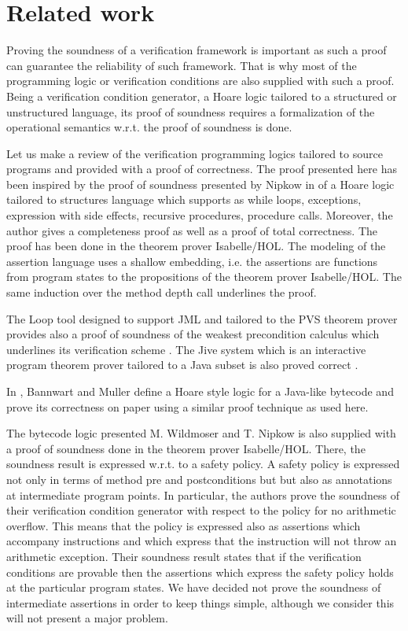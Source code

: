 \section{Related work}\label{proof:relWork}

Proving the soundness of a verification framework is important as such a proof 
can guarantee the reliability of such framework. That is why most of the programming logic
or verification conditions are also supplied with such a proof. 
Being  a verification condition generator, a Hoare logic tailored to a structured or unstructured language, 
 its proof of soundness requires a formalization of the operational semantics  w.r.t. the proof of soundness is done.  

 Let us make a review of the verification programming logics tailored to source programs and provided with a proof
 of correctness. The proof presented here has been inspired by the proof of soundness presented by Nipkow in \cite{Nipkow-MOD2001}
 of a Hoare logic tailored to structures language which supports as while loops, exceptions, expression with side effects,
 recursive procedures, procedure calls. Moreover, the author gives a completeness proof  as well as a proof of  total correctness.
  The proof has been done in the theorem prover Isabelle/HOL. The modeling of the 
 assertion language uses a  shallow embedding, i.e. the assertions are functions from program states to 
  the propositions of the theorem prover Isabelle/HOL. The same induction over the method depth call underlines the proof. 

 The Loop tool designed to support JML and tailored to the PVS theorem prover
  provides also a proof of soundness of the weakest precondition calculus which underlines
 its verification scheme \cite{Jacobs04WPJ}. The Jive system which is an interactive program theorem prover tailored to a Java subset is
 also  proved correct \cite{MH00Arc}.
   
 In \cite{BannwartMueller05}, Bannwart and Muller define a   Hoare style
 logic for a Java-like bytecode and prove its correctness on paper using a similar proof 
 technique as used here. 

 The bytecode logic presented  M. Wildmoser and T. Nipkow \cite{WildmoserN-ESOP05} is  also  supplied with a proof of soundness  done in the theorem prover Isabelle/HOL.
 There, the soundness result is expressed w.r.t. to a safety policy. A safety policy is expressed not only in terms of
  method pre and postconditions but but also as annotations at intermediate  program  points.
 In particular, the authors prove the soundness of their verification condition generator with respect to 
the policy for no arithmetic overflow.  This means that the policy is expressed also as assertions which 
accompany instructions and which express that the instruction will not throw an arithmetic exception.
Their soundness result states that if the verification conditions are provable then
 the assertions which express the safety policy holds at the particular program states. 
We have decided not prove the soundness of intermediate assertions in order to keep things simple,
 although we consider this will not present a major problem.%

